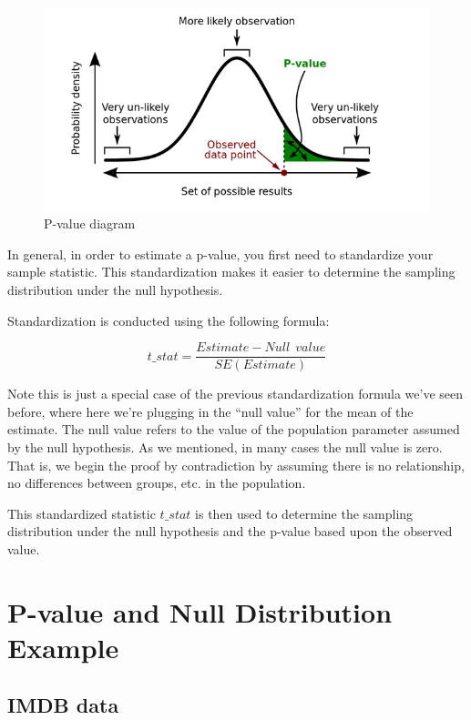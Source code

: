 \documentclass[
  letterpaper,
  DIV=11,
  numbers=noendperiod]{scrreprt}
\theoremstyle{definition}
\theoremstyle{remark}
\begin{document}
\begin{figure}

{\centering \includegraphics{images/p-value-figure.png}

}

\caption{\label{fig-p-value-diagram}P-value diagram}

\end{figure}

In general, in order to estimate a p-value, you first need to
standardize your sample statistic. This standardization makes it easier
to determine the sampling distribution under the null hypothesis.

Standardization is conducted using the following formula:

\[t\_stat = \frac{Estimate - Null \ \ value}{SE(Estimate)}\]

Note this is just a special case of the previous standardization formula
we've seen before, where here we're plugging in the ``null value'' for
the mean of the estimate. The null value refers to the value of the
population parameter assumed by the null hypothesis. As we mentioned, in
many cases the null value is zero. That is, we begin the proof by
contradiction by assuming there is no relationship, no differences
between groups, etc. in the population.

This standardized statistic \(t\_stat\) is then used to determine the
sampling distribution under the null hypothesis and the p-value based
upon the observed value.

\hypertarget{p-value-and-null-distribution-example}{%
\section{P-value and Null Distribution
Example}\label{p-value-and-null-distribution-example}}

\hypertarget{sec-imdb}{%
\subsection{IMDB data}\label{sec-imdb}}
\end{document}
